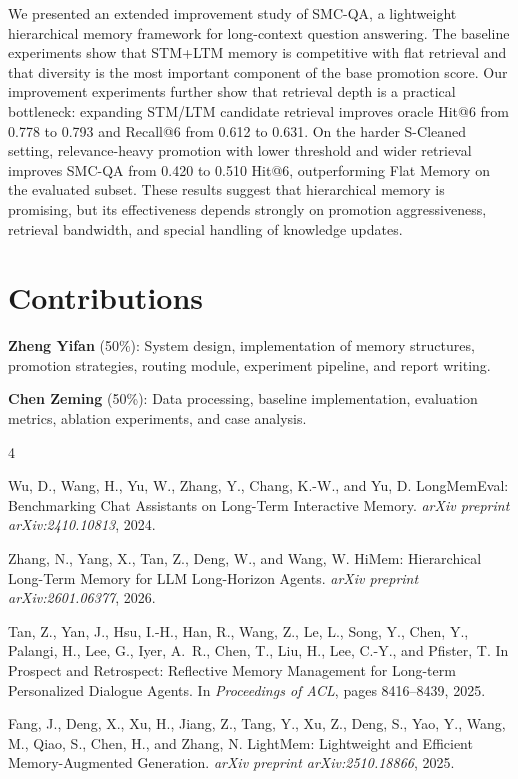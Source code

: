 \documentclass{article}
\begin{document}
We presented an extended improvement study of SMC-QA, a lightweight hierarchical memory framework for long-context question answering. The baseline experiments show that STM+LTM memory is competitive with flat retrieval and that diversity is the most important component of the base promotion score. Our improvement experiments further show that retrieval depth is a practical bottleneck: expanding STM/LTM candidate retrieval improves oracle Hit@6 from 0.778 to 0.793 and Recall@6 from 0.612 to 0.631. On the harder S-Cleaned setting, relevance-heavy promotion with lower threshold and wider retrieval improves SMC-QA from 0.420 to 0.510 Hit@6, outperforming Flat Memory on the evaluated subset. These results suggest that hierarchical memory is promising, but its effectiveness depends strongly on promotion aggressiveness, retrieval bandwidth, and special handling of knowledge updates.

\section{Contributions}

\textbf{Zheng Yifan} (50\%): System design, implementation of memory structures, promotion strategies, routing module, experiment pipeline, and report writing.

\textbf{Chen Zeming} (50\%): Data processing, baseline implementation, evaluation metrics, ablation experiments, and case analysis.


\begin{thebibliography}{4}

Wu, D., Wang, H., Yu, W., Zhang, Y., Chang, K.-W., and Yu, D.
\newblock LongMemEval: Benchmarking Chat Assistants on Long-Term Interactive Memory.
\newblock \emph{arXiv preprint arXiv:2410.10813}, 2024.

Zhang, N., Yang, X., Tan, Z., Deng, W., and Wang, W.
\newblock HiMem: Hierarchical Long-Term Memory for LLM Long-Horizon Agents.
\newblock \emph{arXiv preprint arXiv:2601.06377}, 2026.

Tan, Z., Yan, J., Hsu, I.-H., Han, R., Wang, Z., Le, L., Song, Y., Chen, Y., Palangi, H., Lee, G., Iyer, A.~R., Chen, T., Liu, H., Lee, C.-Y., and Pfister, T.
\newblock In Prospect and Retrospect: Reflective Memory Management for Long-term Personalized Dialogue Agents.
\newblock In \emph{Proceedings of ACL}, pages 8416--8439, 2025.

Fang, J., Deng, X., Xu, H., Jiang, Z., Tang, Y., Xu, Z., Deng, S., Yao, Y., Wang, M., Qiao, S., Chen, H., and Zhang, N.
\newblock LightMem: Lightweight and Efficient Memory-Augmented Generation.
\newblock \emph{arXiv preprint arXiv:2510.18866}, 2025.

\end{thebibliography}
\end{document}
